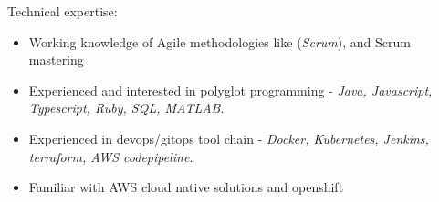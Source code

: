 
\inlineheadsection  %
  {Technical expertise:}
 {
 \emph{}
  \begin{itemize}
      \item Working knowledge of Agile methodologies like (\emph{Scrum}), and Scrum mastering
      \item Experienced and interested in polyglot programming - \emph{Java, Javascript, Typescript, Ruby, SQL, MATLAB}.
      \item Experienced in devops/gitops tool chain - \emph{Docker, Kubernetes, Jenkins, terraform, AWS codepipeline}.
      \item Familiar with AWS cloud native solutions and openshift
  \end{itemize}
  }
